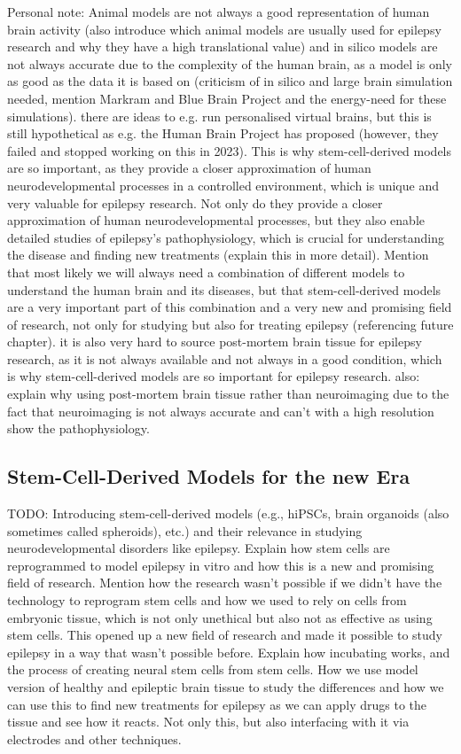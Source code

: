 \documentclass[10pt]{article}
\begin{document}
\begin{sloppypar}
  Personal note: Animal models are not always a good representation of human brain activity (also introduce which animal models are usually used for epilepsy research and why they have a high translational value) and in silico models are not always accurate due to the complexity of the human brain, as a model is only as good as the data it is based on (criticism of in silico and large brain simulation needed, mention Markram and Blue Brain Project and the energy-need for these simulations). there are ideas to e.g. run personalised virtual brains, but this is still hypothetical as e.g. the Human Brain Project has proposed (however, they failed and stopped working on this in 2023). This is why stem-cell-derived models are so important, as they provide a closer approximation of human neurodevelopmental processes in a controlled environment, which is unique and very valuable for epilepsy research. Not only do they provide a closer approximation of human neurodevelopmental processes, but they also enable detailed studies of epilepsy's pathophysiology, which is crucial for understanding the disease and finding new treatments (explain this in more detail). Mention that most likely we will always need a combination of different models to understand the human brain and its diseases, but that stem-cell-derived models are a very important part of this combination and a very new and promising field of research, not only for studying but also for treating epilepsy (referencing future chapter). it is also very hard to source post-mortem brain tissue for epilepsy research, as it is not always available and not always in a good condition, which is why stem-cell-derived models are so important for epilepsy research. also: explain why using post-mortem brain tissue rather than neuroimaging due to the fact that neuroimaging is not always accurate and can't with a high resolution show the pathophysiology.

  \subsection{Stem-Cell-Derived Models for the new Era}
  \label{sec:stem-cell-derived-models-for-the-new-era}

  TODO: Introducing stem-cell-derived models (e.g., hiPSCs, brain organoids (also sometimes called spheroids), etc.) and their relevance in studying neurodevelopmental disorders like epilepsy. Explain how stem cells are reprogrammed to model epilepsy in vitro and how this is a new and promising field of research. Mention how the research wasn't possible if we didn't have the technology to reprogram stem cells and how we used to rely on cells from embryonic tissue, which is not only unethical but also not as effective as using stem cells. This opened up a new field of research and made it possible to study epilepsy in a way that wasn't possible before. Explain how incubating works, and the process of creating neural stem cells from stem cells. How we use model version of healthy and epileptic brain tissue to study the differences and how we can use this to find new treatments for epilepsy as we can apply drugs to the tissue and see how it reacts. Not only this, but also interfacing with it via electrodes and other techniques.


\end{sloppypar}
\end{document}
